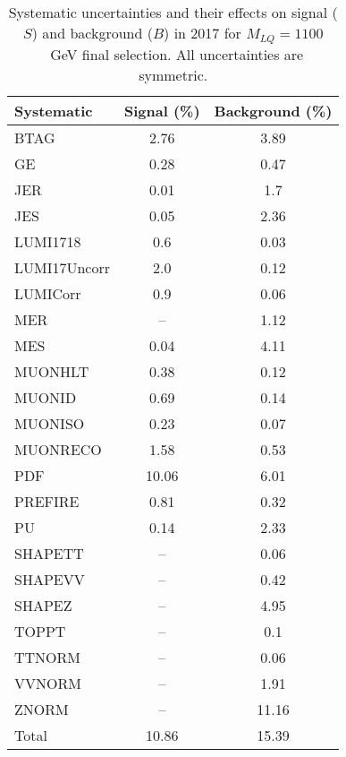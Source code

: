 \begin{table}[htbp]
\begin{center}
\caption{Systematic uncertainties and their effects on signal ($S$) and background ($B$) in 2017 for $M_{LQ}=1100$~GeV final selection. All uncertainties are symmetric.}
\begin{tabular}{lcc}
\hline\hline
Systematic & Signal (\%) & Background (\%) \\ \hline 
BTAG & 2.76 & 3.89\\ 
GE & 0.28 & 0.47\\ 
JER & 0.01 & 1.7\\ 
JES & 0.05 & 2.36\\ 
LUMI1718 & 0.6 & 0.03\\ 
LUMI17Uncorr & 2.0 & 0.12\\ 
LUMICorr & 0.9 & 0.06\\ 
MER & -- & 1.12\\ 
MES & 0.04 & 4.11\\ 
MUONHLT & 0.38 & 0.12\\ 
MUONID & 0.69 & 0.14\\ 
MUONISO & 0.23 & 0.07\\ 
MUONRECO & 1.58 & 0.53\\ 
PDF & 10.06 & 6.01\\ 
PREFIRE & 0.81 & 0.32\\ 
PU & 0.14 & 2.33\\ 
SHAPETT & -- & 0.06\\ 
SHAPEVV & -- & 0.42\\ 
SHAPEZ & -- & 4.95\\ 
TOPPT & -- & 0.1\\ 
TTNORM & -- & 0.06\\ 
VVNORM & -- & 1.91\\ 
ZNORM & -- & 11.16\\ 
Total & 10.86 & 15.39\\ \hline \hline
\end{tabular}
\label{tab:SysUncertainties_uujj_1100}
\end{center}
\end{table}

